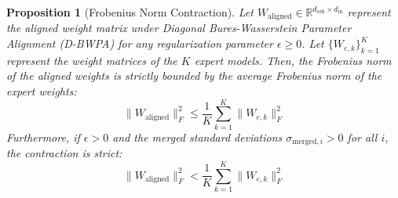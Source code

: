 \documentclass{article}
\theoremstyle{plain}
\newtheorem{proposition}[theorem]{Proposition}
\theoremstyle{definition}
\theoremstyle{remark}
\begin{document}
\begin{proposition}[Frobenius Norm Contraction]
Let $W_{\mathrm{aligned}} \in \mathbb{R}^{d_{\mathrm{out}} \times d_{\mathrm{in}}}$ represent the aligned weight matrix under Diagonal Bures-Wasserstein Parameter Alignment (D-BWPA) for any regularization parameter $\epsilon \ge 0$. Let $\{W_{e, k}\}_{k=1}^K$ represent the weight matrices of the $K$ expert models. Then, the Frobenius norm of the aligned weights is strictly bounded by the average Frobenius norm of the expert weights:
\begin{equation}
  \|W_{\mathrm{aligned}}\|_F^2 \le \frac{1}{K} \sum_{k=1}^K \|W_{e, k}\|_F^2
\end{equation}
Furthermore, if $\epsilon > 0$ and the merged standard deviations $\sigma_{\mathrm{merged}, i} > 0$ for all $i$, the contraction is strict:
\begin{equation}
  \|W_{\mathrm{aligned}}\|_F^2 < \frac{1}{K} \sum_{k=1}^K \|W_{e, k}\|_F^2
\end{equation}
\end{proposition}
\end{document}
